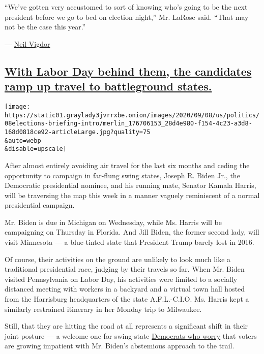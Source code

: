 ``We've gotten very accustomed to sort of knowing who's going to be the
next president before we go to bed on election night,'' Mr. LaRose said.
``That may not be the case this year.''

--- \href{https://www.nytimes3xbfgragh.onion/by/neil-vigdor}{Neil
Vigdor}

\hypertarget{with-labor-day-behind-them-the-candidates-ramp-up-travel-to-battleground-states}{%
\subsection{\texorpdfstring{\protect\hyperlink{with-labor-day-behind-them-the-candidates-ramp-up-travel-to-battleground-states}{With
Labor Day behind them, the candidates ramp up travel to battleground
states.}}{With Labor Day behind them, the candidates ramp up travel to battleground states.}}\label{with-labor-day-behind-them-the-candidates-ramp-up-travel-to-battleground-states}}

\texttt{[image: https://static01.graylady3jvrrxbe.onion/images/2020/09/08/us/politics/08elections-briefing-intro/merlin\_176706153\_28d4e980-f154-4c23-a3d8-168d0818ce92-articleLarge.jpg?quality=75\\\&auto=webp\\\&disable=upscale]}

After almost entirely avoiding air travel for the last six months and
ceding the opportunity to campaign in far-flung swing states, Joseph R.
Biden Jr., the Democratic presidential nominee, and his running mate,
Senator Kamala Harris, will be traversing the map this week in a manner
vaguely reminiscent of a normal presidential campaign.

Mr. Biden is due in Michigan on Wednesday, while Ms. Harris will be
campaigning on Thursday in Florida. And Jill Biden, the former second
lady, will visit Minnesota --- a blue-tinted state that President Trump
barely lost in 2016.

Of course, their activities on the ground are unlikely to look much like
a traditional presidential race, judging by their travels so far. When
Mr. Biden visited Pennsylvania on Labor Day, his activities were limited
to a socially distanced meeting with workers in a backyard and a virtual
town hall hosted from the Harrisburg headquarters of the state
A.F.L.-C.I.O. Ms. Harris kept a similarly restrained itinerary in her
Monday trip to Milwaukee.

Still, that they are hitting the road at all represents a significant
shift in their joint posture --- a welcome one for swing-state
\href{https://www.nytimes3xbfgragh.onion/live/2020/09/07/us/trump-vs-biden/in-the-final-stretch-biden-is-defending-his-lead-against-a-gop-onslaught}{Democrats
who worry} that voters are growing impatient with Mr. Biden's abstemious
approach to the trail.


